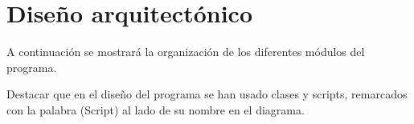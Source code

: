 


\section{Diseño arquitectónico}
A continuación se mostrará la organización de los diferentes módulos del programa.

Destacar que en el diseño del programa se han usado clases y scripts, remarcados con la palabra (Script) al lado de su nombre en el diagrama.



